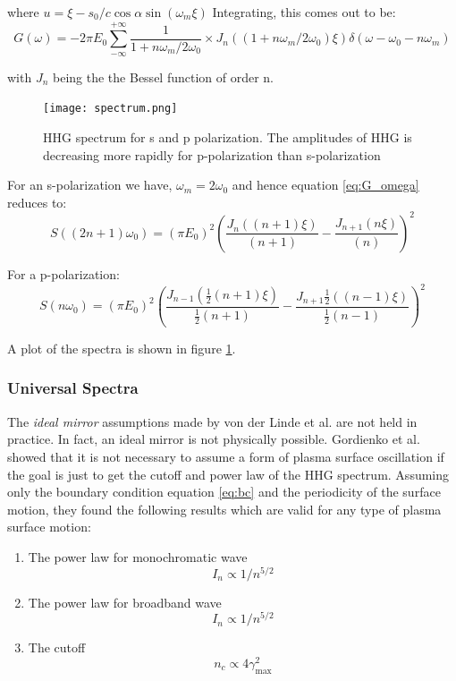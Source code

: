 where $u = \xi - s_0/c \cos\alpha \sin(\omega_m \xi)$ Integrating, this comes out to be:
\begin{equation}
    \label{eq:G_omega}
    G(\omega) = -2 \pi E_0 \sum_{-\infty}^{+\infty} \frac{1}{1+ n\omega_m /2 \omega_0} \times J_n \left(\left( 1+ n\omega_m /2\omega_0\right)\xi\right)\delta \left(\omega - \omega_0 - n\omega_m\right)
\end{equation}

with $J_n$ being the the Bessel function of order n.

\begin{figure}[h]
    \centering
    \texttt{[image: spectrum.png]}
    \caption{HHG spectrum for s and p polarization. The amplitudes of HHG is decreasing more rapidly for p-polarization than s-polarization}
    \label{fig:spectrum}
\end{figure}

For an s-polarization we have, $\omega_m = 2 \omega_0$ and hence equation \ref{eq:G_omega} reduces to:
\begin{equation}
    \label{eq:s-spectrum}
    S((2n+1)\omega_0) = (\pi E_0)^2\left(\frac{J_n((n+1)\xi)}{(n+1)}- \frac{J_{n+1}(n\xi)}{(n)}\right)^2
\end{equation}

For a p-polarization:
\begin{equation}
    \label{eq:p-spectrum}
    S(n\omega_0) = (\pi E_0)^2\left(\frac{J_{n-1}(\frac{1}{2}(n+1)\xi)}{\frac{1}{2}(n+1)}- \frac{J_{n+1}\frac{1}{2}((n-1)\xi)}{\frac{1}{2}(n-1)}\right)^2
\end{equation}

A plot of the spectra is shown in figure \ref{fig:spectrum}.
\subsubsection{Universal Spectra}
The \textit{ideal mirror} assumptions made by von der Linde et al.\cite{hhg-main} are not held in practice. In fact, an ideal mirror is not physically possible. Gordienko et al.\cite{universal-spectra} showed that it is not necessary to assume a form of plasma surface oscillation if the goal is just to get the cutoff and power law of the HHG spectrum. Assuming only the boundary condition equation \ref{eq:bc} and the periodicity of the surface motion, they found the following results which are valid for any type of plasma surface motion:
\begin{enumerate}
    \item The power law for monochromatic wave
          \begin{equation}
              \label{eq:power-law-u}
              I_n \propto 1/n^{5/2}
          \end{equation}
    \item The power law for broadband wave
          \begin{equation*}
              I_n \propto 1/n^{5/2}
          \end{equation*}
    \item The cutoff
          \begin{equation}
              \label{eq:cutoff-u}
              n_c \propto 4\gamma_{\max}^2
          \end{equation}
\end{enumerate}
